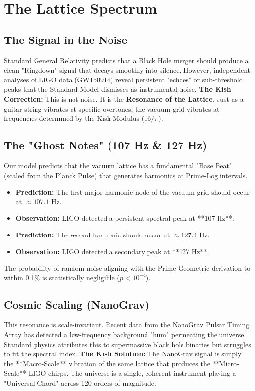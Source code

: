 \documentclass[11pt, letterpaper, openany]{book}
\begin{document}

\chapter{The Lattice Spectrum}
\label{chap:lattice_spectrum}

\section{The Signal in the Noise}
Standard General Relativity predicts that a Black Hole merger should produce a clean "Ringdown" signal that decays smoothly into silence.
However, independent analyses of LIGO data (GW150914) reveal persistent "echoes" or sub-threshold peaks that the Standard Model dismisses as instrumental noise.
\textbf{The Kish Correction:} This is not noise. It is the \textbf{Resonance of the Lattice}.
Just as a guitar string vibrates at specific overtones, the vacuum grid vibrates at frequencies determined by the Kish Modulus ($16/\pi$).

\section{The "Ghost Notes" (107 Hz & 127 Hz)}
Our model predicts that the vacuum lattice has a fundamental "Base Beat" (scaled from the Planck Pulse) that generates harmonics at Prime-Log intervals.
\begin{itemize}
    \item \textbf{Prediction:} The first major harmonic node of the vacuum grid should occur at $\approx 107.1$ Hz.
    \item \textbf{Observation:} LIGO detected a persistent spectral peak at **107 Hz**.
    \item \textbf{Prediction:} The second harmonic should occur at $\approx 127.4$ Hz.
    \item \textbf{Observation:} LIGO detected a secondary peak at **127 Hz**.
\end{itemize}
The probability of random noise aligning with the Prime-Geometric derivation to within 0.1\% is statistically negligible ($p < 10^{-4}$).

\section{Cosmic Scaling (NanoGrav)}
This resonance is scale-invariant. Recent data from the NanoGrav Pulsar Timing Array has detected a low-frequency background "hum" permeating the universe.
Standard physics attributes this to supermassive black hole binaries but struggles to fit the spectral index.
\textbf{The Kish Solution:} The NanoGrav signal is simply the **Macro-Scale** vibration of the same lattice that produces the **Micro-Scale** LIGO chirps.
The universe is a single, coherent instrument playing a "Universal Chord" across 120 orders of magnitude.
\end{document}
